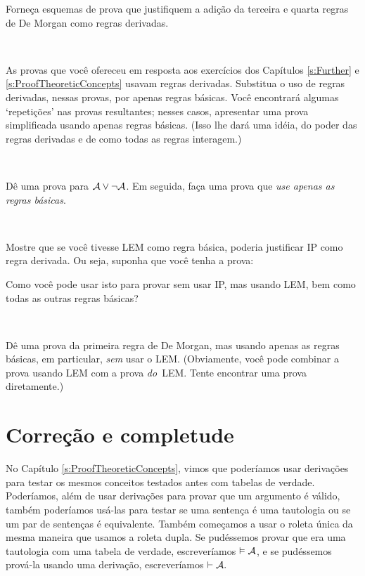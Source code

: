 \practiceproblems

\problempart
Forne\c ca esquemas de prova que justifiquem a adi\c c\~ao da terceira e quarta regras de De Morgan como regras derivadas.

\

\problempart
As provas que voc\^e ofereceu em resposta aos exerc\'icios dos Capítulos  \ref{s:Further} e \ref{s:ProofTheoreticConcepts} usavam regras derivadas. Substitua o uso de regras derivadas, nessas provas, por apenas regras b\'asicas. Voc\^e encontrar\'a algumas `repeti\c c\~oes' nas provas resultantes; nesses casos, apresentar uma prova simplificada usando apenas regras b\'asicas. (Isso lhe dar\'a uma id\'eia, do poder das regras derivadas e de como todas as regras interagem.)

\

\problempart
D\^e uma prova para $\mathcal{A} \vee \neg\mathcal{A}$. Em seguida, fa\c ca uma prova que \emph{use apenas as regras b\'asicas}.

\

\problempart
Mostre que se voc\^e tivesse LEM como regra b\'asica, poderia justificar IP como regra derivada. Ou seja, suponha que voc\^e tenha a prova:
\begin{fitchproof}
  \open
  \close
\end{fitchproof}
Como voc\^e pode usar isto para provar  sem usar IP, mas usando
LEM, bem como todas as outras regras b\'asicas?

\

\problempart
D\^e uma prova da primeira regra de De Morgan, mas usando apenas as regras b\'asicas, em particular,  \emph{sem} usar o LEM. (Obviamente, voc\^e pode combinar a prova usando LEM com a prova  \emph{do}~LEM. Tente encontrar uma prova diretamente.)


\chapter{Corre\c c\~ao e completude}
\label{sec:soundness_and_completeness}

No Capítulo \ref{s:ProofTheoreticConcepts}, vimos que poder\'iamos usar deriva\c c\~oes para testar os mesmos conceitos testados antes com tabelas de verdade. Poder\'iamos, al\'em de usar deriva\c c\~oes para provar que um argumento \'e v\'alido, tamb\'em poder\'iamos us\'a-las para testar se uma senten\c ca \'e uma tautologia ou se um par de senten\c cas \'e equivalente. Tamb\'em come\c camos a usar o roleta \'unica da mesma maneira que usamos a roleta  dupla.  Se pud\'essemos provar que  era uma tautologia com uma tabela de verdade,  escrever\'iamos  $\vDash \mathcal{A}$, e se pud\'essemos prov\'a-la usando uma deriva\c c\~ao, escrever\'iamos $\vdash \mathcal{A}.$ 

